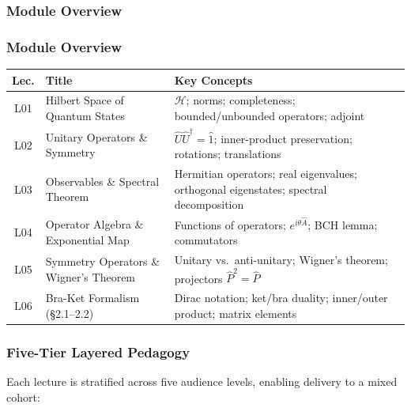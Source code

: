 \documentclass[11pt,a4paper]{article}
\begin{document}
\subsubsection*{Module Overview}

\subsubsection*{Module Overview}

\begin{center}
\begin{tabular}{@{}clp{5.8cm}@{}}
\toprule
\textbf{Lec.} & \textbf{Title} & \textbf{Key Concepts}\\
\midrule
L01 & Hilbert Space of Quantum States & $\mathcal{H}$; norms; completeness; bounded/unbounded operators; adjoint\\
L02 & Unitary Operators \& Symmetry & $\hat{U}\hat{U}^\dagger=\hat{1}$; inner-product preservation; rotations; translations\\
L03 & Observables \& Spectral Theorem & Hermitian operators; real eigenvalues; orthogonal eigenstates; spectral decomposition\\
L04 & Operator Algebra \& Exponential Map & Functions of operators; $e^{i\theta\hat{A}}$; BCH lemma; commutators\\
L05 & Symmetry Operators \& Wigner's Theorem & Unitary vs.\ anti-unitary; Wigner's theorem; projectors $\hat{P}^2=\hat{P}$\\
L06 & Bra-Ket Formalism (\S2.1--2.2) & Dirac notation; ket/bra duality; inner/outer product; matrix elements\\
\bottomrule
\end{tabular}
\end{center}

\subsubsection*{Five-Tier Layered Pedagogy}

Each lecture is stratified across five audience levels, enabling delivery to a mixed cohort:
\end{document}
